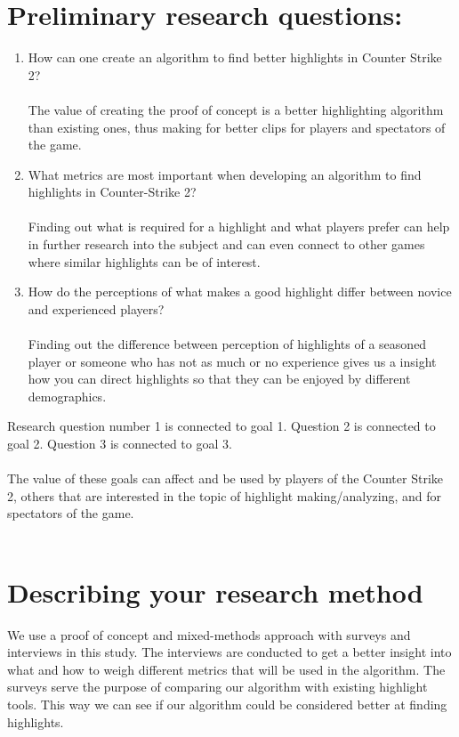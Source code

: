 \section{Preliminary research questions:}
\normalsize
\begin{enumerate}[label=RQ\arabic*., leftmargin=*]
    \item How can one create an algorithm to find better highlights in Counter Strike 2? \\\\
    The value of creating the proof of concept is a better highlighting algorithm than existing ones, thus making for better clips for players and spectators of the game. 
    \item What metrics are most important when developing an algorithm to find highlights in Counter-Strike 2? \\\\
    Finding out what is required for a highlight and what players prefer can help in further research into the subject and can even connect to other games where similar highlights can be of interest.
    \item How do the perceptions of what makes a good highlight differ between novice and experienced players?\\\\
    Finding out the difference between perception of highlights of a seasoned player or someone who has not as much or no experience gives us a insight how you can direct highlights so that they can be enjoyed by different demographics. 
    
\end{enumerate}
Research question number 1 is connected to goal 1. Question 2 is connected to goal 2. Question 3 is connected to goal 3.\\\\
The value of these goals can affect and be used by players of the Counter Strike 2, others that are interested in the topic of highlight making/analyzing, and for spectators of the game.\\\\

\section{Describing your research method}
We use a proof of concept and mixed-methods approach with surveys and interviews in this study. The interviews are conducted to get a better insight into what and how to weigh different metrics that will be used in the algorithm. The surveys serve the purpose of comparing our algorithm with existing highlight tools. This way we can see if our algorithm could be considered better at finding highlights.
